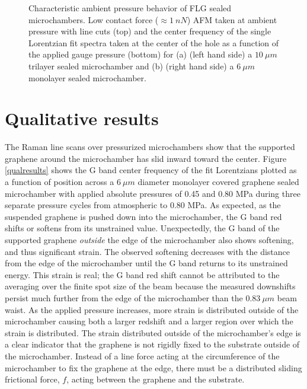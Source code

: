 \begin{figure}
\begin{center}
\end{center}
\caption{Characteristic ambient pressure behavior of FLG sealed microchambers. Low contact force ($\approx 1\ nN$) AFM taken at ambient pressure with line cuts (top) and the center frequency of the single Lorentzian fit spectra taken at the center of the hole as a function of the applied gauge pressure (bottom) for (a) (left hand side) a $10 \ \mu m$ trilayer sealed microchamber and (b) (right hand side) a $6 \ \mu m$ monolayer sealed microchamber.\label{ambient}}
\end{figure}

\section{Qualitative results}
The Raman line scans over pressurized microchambers show that the supported graphene around the microchamber has slid inward toward the center.  Figure \ref{qualresults} shows the G band center frequency of the fit Lorentzians plotted as a function of position across a $6 \ \mu m$ diameter monolayer covered graphene sealed microchamber with applied absolute pressures of 0.45 and 0.80 MPa during three separate pressure cycles from atmospheric to 0.80 MPa. As expected, as the suspended graphene is pushed down into the microchamber, the G band red shifts or softens from its unstrained value.  Unexpectedly, the G band of the supported graphene \emph{outside} the edge of the microchamber also shows softening, and thus significant strain.  The observed softening decreases with the distance from the edge of the microchamber until the G band returns to its unstrained energy.  This strain is real; the G band red shift cannot be attributed to the averaging over the finite spot size of the beam because the measured downshifts persist much further from the edge of the microchamber than the $0.83 \ \mu m$ beam waist. As the applied pressure increases, more strain is distributed outside of the microchamber causing both a larger redshift and a larger region over which the strain is distributed.  The strain distributed outside of the microchamber's edge is a clear indicator that the graphene is not rigidly fixed to the substrate outside of the microchamber.  Instead of a line force acting at the circumference of the microchamber to fix the graphene at the edge, there must be a distributed sliding frictional force, $f$, acting between the graphene and the substrate.

